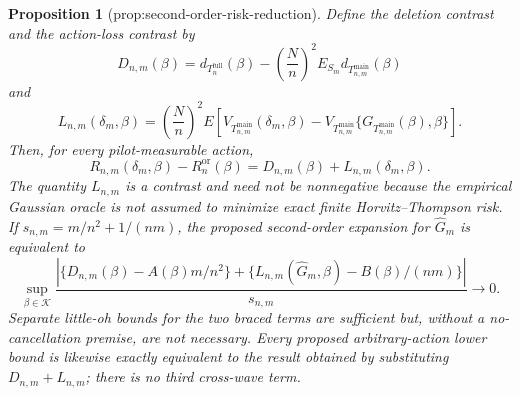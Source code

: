 \documentclass{article}
\newtheorem{proposition}{Proposition}
\begin{document}
\begin{proposition}[prop:second-order-risk-reduction]\label{prop:second-order-risk-reduction}
Define the deletion contrast and the action-loss contrast by
\[
D_{n,m}(\beta)
=d_{T_n^{\mathrm{full}}}(\beta)
-\left(\frac Nn\right)^2
E_{S_m}d_{T_{n,m}^{\mathrm{main}}}(\beta)
\]
and
\[
L_{n,m}(\delta_m,\beta)
=\left(\frac Nn\right)^2
E\!\left[
V_{T_{n,m}^{\mathrm{main}}}(\delta_m,\beta)
-V_{T_{n,m}^{\mathrm{main}}}
\{G_{T_{n,m}^{\mathrm{main}}}(\beta),\beta\}
\right].
\]
Then, for every pilot-measurable action,
\[
R_{n,m}(\delta_m,\beta)-R_n^{\mathrm{or}}(\beta)
=D_{n,m}(\beta)+L_{n,m}(\delta_m,\beta).
\]
The quantity \(L_{n,m}\) is a contrast and need not be nonnegative because the empirical Gaussian oracle is not assumed to minimize exact finite Horvitz--Thompson risk.  If \(s_{n,m}=m/n^2+1/(nm)\), the proposed second-order expansion for \(\widehat G_m\) is equivalent to
\[
\sup_{\beta\in\mathcal K}
\frac{\left|
\{D_{n,m}(\beta)-A(\beta)m/n^2\}
+\{L_{n,m}(\widehat G_m,\beta)-B(\beta)/(nm)\}
\right|}{s_{n,m}}\longrightarrow0.
\]
Separate little-oh bounds for the two braced terms are sufficient but, without a no-cancellation premise, are not necessary.  Every proposed arbitrary-action lower bound is likewise exactly equivalent to the result obtained by substituting \(D_{n,m}+L_{n,m}\); there is no third cross-wave term.
\end{proposition}
\end{document}

